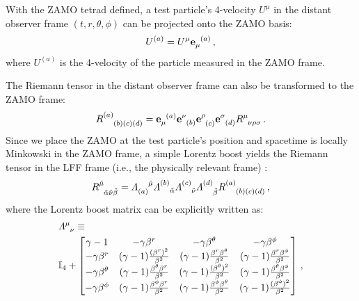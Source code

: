 \documentclass[
    reprint,
    prd,
    nofootinbib,
    amsmath,amssymb,
    aps,
    floatfix,
]{revtex4-2}
\begin{document}
With the ZAMO tetrad defined, a test particle's 4-velocity $U^{\mu}$ in the distant observer frame $(t, r, \theta, \phi)$ can be projected onto the ZAMO basis:
\begin{equation}
    U^{(a)} = U^{\mu} \tensor{\mathbf{e}}{_{\mu}^{(a)}} \, ,
\end{equation}
where $U^{(a)}$ is the 4-velocity of the particle measured in the ZAMO frame.

The Riemann tensor in the distant observer frame can also be transformed to the ZAMO frame:
\begin{equation}
    \tensor{R}{^{(a)}_{(b)(c)(d)}} = \tensor{\mathbf{e}}{_{\mu}^{(a)}} \tensor{\mathbf{e}}{^{\nu}_{(b)}} \tensor{\mathbf{e}}{^{\rho}_{(c)}} \tensor{\mathbf{e}}{^{\sigma}_{(d)}} \tensor{R}{^{\mu}_{\nu \rho \sigma}} \, .
\end{equation}
Since we place the ZAMO at the test particle's position and spacetime is locally Minkowski in the ZAMO frame, a simple Lorentz boost yields the Riemann tensor in the LFF frame (i.e., the physically relevant frame) \cite{Bardeen1972}:
\begin{equation}
    \tensor{R}{^{\tilde{\mu}}_{\tilde{\alpha} \tilde{\nu} \tilde{\beta}}} = \tensor{\varLambda}{_{(a)}^{\tilde{\mu}}} \tensor{\varLambda}{^{(b)}_{\tilde{\alpha}}} \tensor{\varLambda}{^{(c)}_{\tilde{\nu}}} \tensor{\varLambda}{^{(d)}_{\tilde{\beta}}} \tensor{R}{^{(a)}_{(b)(c)(d)}} \, ,
\end{equation}
where the Lorentz boost matrix can be explicitly written as:
\begin{equation}
    \begin{split}
        &\tensor{\varLambda}{^{\mu}_{\nu}} \equiv \\
        &\mathbb{I}_{4} + \begin{bmatrix}
            \gamma - 1            & -\gamma \beta^{r}                                      & -\gamma\beta^{\theta}                                     & -\gamma\beta^{\phi}                                       \\
            -\gamma\beta^{r}      & (\gamma - 1) \frac{(\beta^{r})^{2}}{\beta^{2}}         & (\gamma - 1) \frac{\beta^{r}\beta^{\theta}}{\beta^{2}}    & (\gamma - 1) \frac{\beta^{r}\beta^{\phi}}{\beta^{2}}      \\
            -\gamma\beta^{\theta} & (\gamma - 1) \frac{\beta^{\theta}\beta^{r}}{\beta^{2}} & (\gamma - 1) \frac{(\beta^{\theta})^{2}}{\beta^{2}}       & (\gamma - 1) \frac{\beta^{\theta}\beta^{\phi}}{\beta^{2}} \\
            -\gamma\beta^{\phi}   & (\gamma - 1) \frac{\beta^{\phi}\beta^{r}}{\beta^{2}}   & (\gamma - 1) \frac{\beta^{\phi}\beta^{\theta}}{\beta^{2}} & (\gamma - 1) \frac{(\beta^{\phi})^{2}}{\beta^{2}}
        \end{bmatrix} \, ,
    \end{split}
\end{equation}
\end{document}

